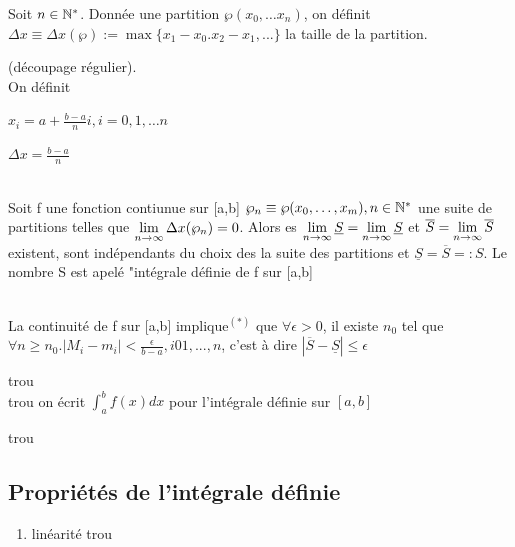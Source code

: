 \documentclass[12pt,a4paper]{article}
\begin{document}
{\begin{itemize}
\end{itemize}
\begin{boite}
	\Definition Soit $n \in \mathbb{N}^*$. Donnée une partition $\wp(x_0,\ldots x_n)$, on définit $\Delta x \equiv \Delta x (\wp) := \max\{x_1-x_0. x_2-x_1,...\}$ la taille de la partition.
\end{boite}
 (découpage régulier).\\
On définit
\begin{center}$
x_i = a + \frac{b-a}{n}i, i=0,1,\ldots n$
\end{center}
\begin{center}$
	\Delta x = \frac{b-a}{n}
$\end{center}


\begin{boite}
\\
	Soit f une fonction contiunue sur [a,b] $\wp_n \equiv \wp (x_0,\ldots,x_m), n\in \mathbb{N}^*$ une suite de partitions telles que $\lim\limits_{n \to \infty}{\Delta x (\wp_n)} = 0$. Alors es $\lim\limits_{n \to \infty}{\underline{S}} = \lim\limits_{n \to \infty}{\underline{S}}$ et $\overline{S} = \lim\limits_{n \to \infty}{\overline{S}}$ existent, sont indépendants du choix des la suite des partitions et $\underline{S} = \overline{S} =: S$. Le nombre S est apelé "intégrale définie de f sur [a,b]
\end{boite}
\\
La continuité de f sur [a,b] implique$^{(*)}$ que $\forall \epsilon > 0$, il existe $n_0$ tel que $\forall n \geq n_0. |M_i -m_i| < \frac{\epsilon}{b-a}, i 0 1,...,n$, c'est à dire $|\overline{S} - \underline{S}| \leq \epsilon$

 {trou}\\
 {trou}
 on écrit $\int_a^b f(x) dx$ pour l'intégrale définie sur $[a,b]$ 

{trou}

\subsection{Propriétés de l'intégrale définie}

\begin{boite}
	\begin{enumerate}
		\item linéarité
		{trou}
	\end{enumerate}
\end{boite}
}
\end{document}
